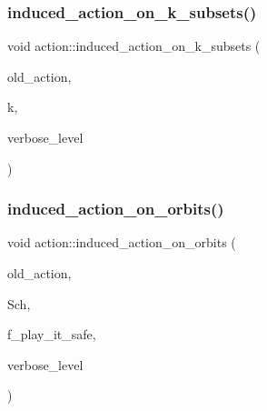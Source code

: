 \subsubsection{\texorpdfstring{induced\+\_\+action\+\_\+on\+\_\+k\+\_\+subsets()}{induced\_action\_on\_k\_subsets()}}
{\footnotesize\ttfamily void action\+::induced\+\_\+action\+\_\+on\+\_\+k\+\_\+subsets (\begin{DoxyParamCaption}\item[{\mbox{\hyperlink{classaction}{action}} \&}]{old\+\_\+action,  }\item[{\mbox{\hyperlink{galois_8h_a09fddde158a3a20bd2dcadb609de11dc}{I\+NT}}}]{k,  }\item[{\mbox{\hyperlink{galois_8h_a09fddde158a3a20bd2dcadb609de11dc}{I\+NT}}}]{verbose\+\_\+level }\end{DoxyParamCaption})}

\mbox{\label{classaction_a875913e4919877fe3dcae039ce44d7d8}} 
\subsubsection{\texorpdfstring{induced\+\_\+action\+\_\+on\+\_\+orbits()}{induced\_action\_on\_orbits()}}
{\footnotesize\ttfamily void action\+::induced\+\_\+action\+\_\+on\+\_\+orbits (\begin{DoxyParamCaption}\item[{\mbox{\hyperlink{classaction}{action}} $\ast$}]{old\+\_\+action,  }\item[{\mbox{\hyperlink{classschreier}{schreier}} $\ast$}]{Sch,  }\item[{\mbox{\hyperlink{galois_8h_a09fddde158a3a20bd2dcadb609de11dc}{I\+NT}}}]{f\+\_\+play\+\_\+it\+\_\+safe,  }\item[{\mbox{\hyperlink{galois_8h_a09fddde158a3a20bd2dcadb609de11dc}{I\+NT}}}]{verbose\+\_\+level }\end{DoxyParamCaption})}

\mbox{\label{classaction_ad290e0cc115881e0b9ddab7f7071975e}} 
